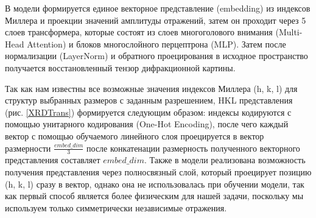 В модели формируется единое векторное представление (embedding) из индексов Миллера и проекции значений амплитуды отражений, затем он проходит через 5 слоев трансформера, которые состоят из слоев многоголового внимания (Multi-Head Attention) и блоков многослойного перцептрона (MLP). Затем после нормализации (LayerNorm) и обратного проецирования в исходное пространство получается восстановленный тензор дифракционной картины.

Так как нам известны все возможные значения индексов Миллера (h, k, l) для структур выбранных размеров с заданным разрешением, HKL представления (рис. \ref{XRDTrans}) формируется следующим образом: индексы кодируются с помощью унитарного кодирования (One-Hot Encoding), после чего каждый вектор с помощью обучаемого линейного слоя проецируется в вектор размерности $\frac{embed\_dim}{3}$ после конкатенации размерность полученного векторного представления составляет $embed\_dim$. Также в модели реализована возможность получения представления через полносвязный слой, который проецирует позицию (h, k, l) сразу в вектор, однако она не использовалась при обучении модели, так как первый способ является более физическим для нашей задачи, поскольку мы используем только симметрически независимые отражения.



